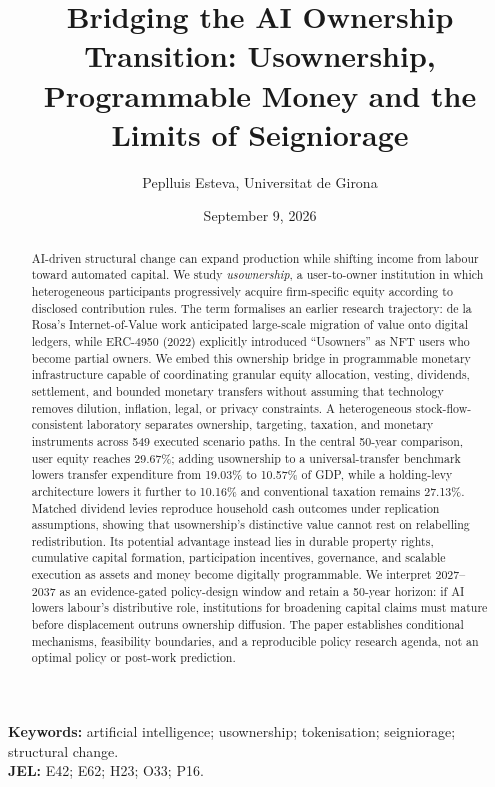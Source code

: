 \documentclass[11pt,a4paper]{article}
\title{Bridging the AI Ownership Transition: Usownership, Programmable Money and the Limits of Seigniorage}
\author{Peplluis Esteva, Universitat de Girona}
\date{September 9, 2026}
\begin{document}
\maketitle
\vspace{-2em}
\begin{abstract}
AI-driven structural change can expand production while shifting income from labour toward automated capital. We study \emph{usownership}, a user-to-owner institution in which heterogeneous participants progressively acquire firm-specific equity according to disclosed contribution rules. The term formalises an earlier research trajectory: de la Rosa's Internet-of-Value work anticipated large-scale migration of value onto digital ledgers, while ERC-4950 (2022) explicitly introduced ``Usowners'' as NFT users who become partial owners. We embed this ownership bridge in programmable monetary infrastructure capable of coordinating granular equity allocation, vesting, dividends, settlement, and bounded monetary transfers without assuming that technology removes dilution, inflation, legal, or privacy constraints. A heterogeneous stock-flow-consistent laboratory separates ownership, targeting, taxation, and monetary instruments across 549 executed scenario paths. In the central 50-year comparison, user equity reaches 29.67\%; adding usownership to a universal-transfer benchmark lowers transfer expenditure from 19.03\% to 10.57\% of GDP, while a holding-levy architecture lowers it further to 10.16\% and conventional taxation remains 27.13\%. Matched dividend levies reproduce household cash outcomes under replication assumptions, showing that usownership's distinctive value cannot rest on relabelling redistribution. Its potential advantage instead lies in durable property rights, cumulative capital formation, participation incentives, governance, and scalable execution as assets and money become digitally programmable. We interpret 2027--2037 as an evidence-gated policy-design window and retain a 50-year horizon: if AI lowers labour's distributive role, institutions for broadening capital claims must mature before displacement outruns ownership diffusion. The paper establishes conditional mechanisms, feasibility boundaries, and a reproducible policy research agenda, not an optimal policy or post-work prediction.
\end{abstract}
\noindent\textbf{Keywords:} artificial intelligence; usownership; tokenisation; seigniorage; structural change.\\
\textbf{JEL:} E42; E62; H23; O33; P16.








\clearpage


\end{document}
